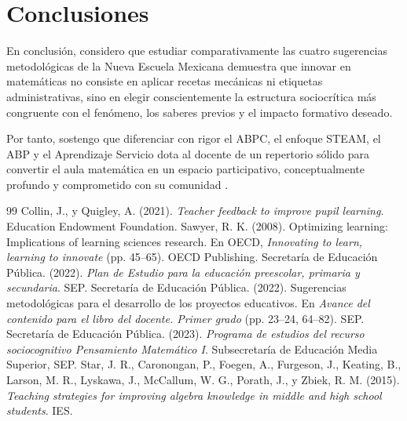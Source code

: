 \documentclass[spanish,letterpaper,oneside]{article}
\begin{document}
\clearpage
\section{Conclusiones}
En conclusión, considero que estudiar comparativamente las cuatro sugerencias metodológicas de la Nueva Escuela Mexicana demuestra que innovar en matemáticas no consiste en aplicar recetas mecánicas ni etiquetas administrativas, sino en elegir conscientemente la estructura sociocrítica más congruente con el fenómeno, los saberes previos y el impacto formativo deseado.

Por tanto, sostengo que diferenciar con rigor el ABPC, el enfoque STEAM, el ABP y el Aprendizaje Servicio dota al docente de un repertorio sólido para convertir el aula matemática en un espacio participativo, conceptualmente profundo y comprometido con su comunidad \citep{sep2022plan,sep2023pensamiento}.

\clearpage
\begin{thebibliography}{99}
 Collin, J., y Quigley, A. (2021). \textit{Teacher feedback to improve pupil learning}. Education Endowment Foundation.
 Sawyer, R. K. (2008). Optimizing learning: Implications of learning sciences research. En OECD, \textit{Innovating to learn, learning to innovate} (pp. 45--65). OECD Publishing.
 Secretaría de Educación Pública. (2022). \textit{Plan de Estudio para la educación preescolar, primaria y secundaria}. SEP.
 Secretaría de Educación Pública. (2022). Sugerencias metodológicas para el desarrollo de los proyectos educativos. En \textit{Avance del contenido para el libro del docente. Primer grado} (pp. 23--24, 64--82). SEP.
 Secretaría de Educación Pública. (2023). \textit{Programa de estudios del recurso sociocognitivo Pensamiento Matemático I}. Subsecretaría de Educación Media Superior, SEP.
 Star, J. R., Caronongan, P., Foegen, A., Furgeson, J., Keating, B., Larson, M. R., Lyskawa, J., McCallum, W. G., Porath, J., y Zbiek, R. M. (2015). \textit{Teaching strategies for improving algebra knowledge in middle and high school students}. IES.
\end{thebibliography}
\end{document}
